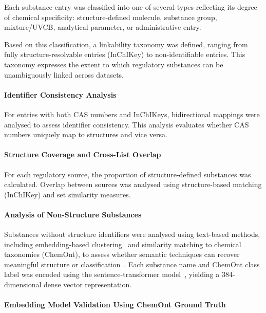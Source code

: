 Each substance entry was classified into one of several types reflecting its
degree of chemical specificity: structure-defined molecule, substance group,
mixture/UVCB, analytical parameter, or administrative entry.

Based on this classification, a linkability taxonomy was defined, ranging from
fully structure-resolvable entries (InChIKey) to non-identifiable entries.
This taxonomy expresses the extent to which regulatory substances can be
unambiguously linked across datasets.

\paragraph{Identifier Consistency Analysis}

For entries with both CAS numbers and InChIKeys, bidirectional mappings were
analysed to assess identifier consistency. This analysis evaluates whether CAS
numbers uniquely map to structures and vice versa.

\paragraph{Structure Coverage and Cross-List Overlap}

For each regulatory source, the proportion of structure-defined substances was
calculated. Overlap between sources was analysed using structure-based matching
(InChIKey) and set similarity measures.

\paragraph{Analysis of Non-Structure Substances}

Substances without structure identifiers were analysed using text-based
methods, including embedding-based clustering~\cite{Rousseeuw1987,Lloyd1982,McInnes2018} 
and similarity matching to chemical taxonomies (ChemOnt), to assess whether 
semantic techniques can recover meaningful structure or classification~\cite{Manning2008,DjoumbouFeunang2016}.
Each substance name and ChemOnt class label was encoded using the  sentence-transformer model~\cite{Reimers2019,Wang2020MiniLM,devlin-etal-2019-bert}, yielding a 384-dimensional dense vector representation.

\paragraph{Embedding Model Validation Using ChemOnt Ground Truth}
\label{sec:chemont_validation}

